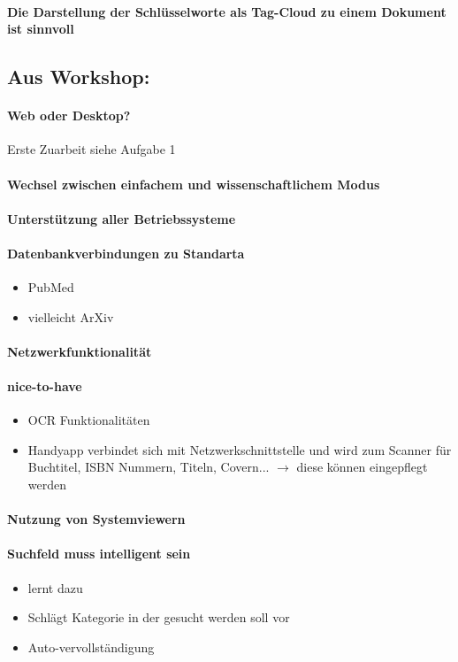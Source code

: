 \documentclass[a4paper,12pt]{article}
\begin{document}
\paragraph{Die Darstellung der Schlüsselworte als Tag-Cloud zu einem Dokument ist sinnvoll}

\subsection{Aus Workshop:}
\paragraph{Web oder Desktop?}
Erste Zuarbeit siehe Aufgabe 1
\paragraph{Wechsel zwischen einfachem und wissenschaftlichem Modus}
\paragraph{Unterstützung aller Betriebssysteme}
\paragraph{Datenbankverbindungen zu Standarta}
\begin{itemize}
\item PubMed
\item vielleicht ArXiv
\end{itemize}

\paragraph{Netzwerkfunktionalität}

\paragraph{nice-to-have}
\begin{itemize}
\item OCR Funktionalitäten
\item Handyapp verbindet sich mit Netzwerkschnittstelle und wird zum Scanner für
Buchtitel, ISBN Nummern, Titeln, Covern... $\to$ diese können eingepflegt werden
\end{itemize}

\paragraph{Nutzung von Systemviewern}

\paragraph{Suchfeld muss intelligent sein}
\begin{itemize}
\item lernt dazu
\item Schlägt Kategorie in der gesucht werden soll vor
\item Auto-vervollständigung
\end{itemize}
\end{document}

